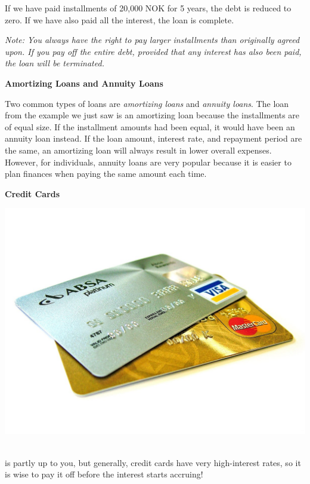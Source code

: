 \begin{itemize}
	If we have paid installments of 20,000 NOK for 5 years, the debt is reduced to zero. If we have also paid all the interest, the loan is complete.\vspace{5pt}
	
	{\footnotesize\textit{Note: You always have the right to pay larger installments than originally agreed upon. If you pay off the entire debt, provided that any interest has also been paid, the loan will be terminated.}}
\end{itemize}
\vspace{5pt}
\textbf{Amortizing Loans and Annuity Loans}\vspace{5pt}

Two common types of loans are \textit{amortizing loans} and \textit{annuity loans}. The loan from the example we just saw is an amortizing loan because the installments are of equal size. If the installment amounts had been equal, it would have been an annuity loan instead. If the loan amount, interest rate, and repayment period are the same, an amortizing loan will always result in lower overall expenses. However, for individuals, annuity loans are very popular because it is easier to plan finances when paying the same amount each time. \vspace{5pt}

\textbf{Credit Cards}\vspace{5pt}\\
\qquad
\parbox{0.3\linewidth}{\includegraphics[scale=0.1]{kred}}\\[2pt]
is partly up to you, but generally, credit cards have very high-interest rates, so it is wise to pay it off before the interest starts accruing!

